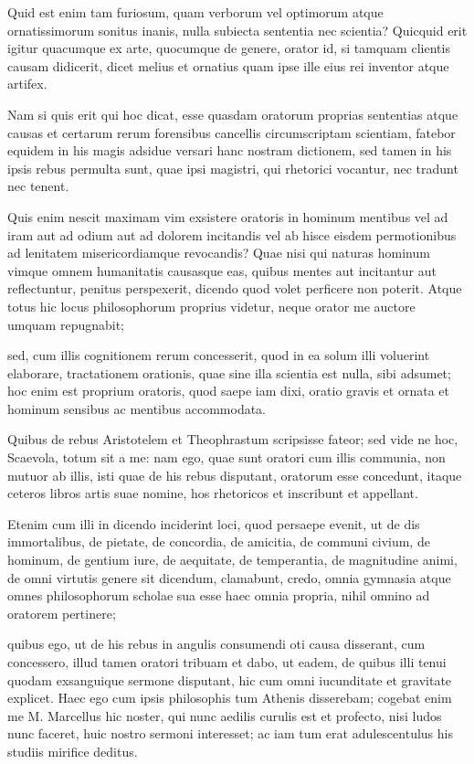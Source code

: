  Quid est enim tam furiosum, quam verborum vel optimorum atque ornatissimorum sonitus inanis, nulla subiecta sententia nec scientia? Quicquid erit igitur quacumque ex arte, quocumque de genere, orator id, si tamquam clientis causam didicerit, dicet melius et ornatius quam ipse ille eius rei inventor atque artifex.

 Nam si quis erit qui hoc dicat, esse quasdam oratorum proprias sententias atque causas et certarum rerum forensibus cancellis circumscriptam scientiam, fatebor equidem in his magis adsidue versari hanc nostram dictionem, sed tamen in his ipsis rebus permulta sunt, quae ipsi magistri, qui rhetorici vocantur, nec tradunt nec tenent.

 Quis enim nescit maximam vim exsistere oratoris in hominum mentibus vel ad iram aut ad odium aut ad dolorem incitandis vel ab hisce eisdem permotionibus ad lenitatem misericordiamque revocandis? Quae nisi qui naturas hominum vimque omnem humanitatis causasque eas, quibus mentes aut incitantur aut reflectuntur, penitus perspexerit, dicendo quod volet perficere non poterit. Atque totus hic locus philosophorum proprius videtur, neque orator me auctore umquam repugnabit;

 sed, cum illis cognitionem rerum concesserit, quod in ea solum illi voluerint elaborare, tractationem orationis, quae sine illa scientia est nulla, sibi adsumet; hoc enim est proprium oratoris, quod saepe iam dixi, oratio gravis et ornata et hominum sensibus ac mentibus accommodata.

 Quibus de rebus Aristotelem et Theophrastum scripsisse fateor; sed vide ne hoc, Scaevola, totum sit a me: nam ego, quae sunt oratori cum illis communia, non mutuor ab illis, isti quae de his rebus disputant, oratorum esse concedunt, itaque ceteros libros artis suae nomine, hos rhetoricos et inscribunt et appellant.

 Etenim cum illi in dicendo inciderint loci, quod persaepe evenit, ut de dis immortalibus, de pietate, de concordia, de amicitia, de communi civium, de hominum, de gentium iure, de aequitate, de temperantia, de magnitudine animi, de omni virtutis genere sit dicendum, clamabunt, credo, omnia gymnasia atque omnes philosophorum scholae sua esse haec omnia propria, nihil omnino ad oratorem pertinere;

 quibus ego, ut de his rebus in angulis consumendi oti causa disserant, cum concessero, illud tamen oratori tribuam et dabo, ut eadem, de quibus illi tenui quodam exsanguique sermone disputant, hic cum omni iucunditate et gravitate explicet. Haec ego cum ipsis philosophis tum Athenis disserebam; cogebat enim me M. Marcellus hic noster, qui nunc aedilis curulis est et profecto, nisi ludos nunc faceret, huic nostro sermoni interesset; ac iam tum erat adulescentulus his studiis mirifice deditus.

